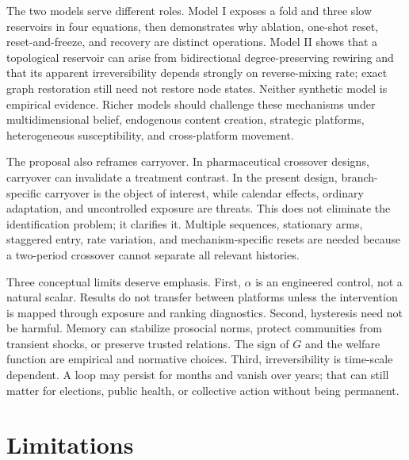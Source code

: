 \documentclass[10pt,a4paper]{article}
\begin{document}
The two models serve different roles. Model I exposes a fold and three slow reservoirs in four equations, then demonstrates why ablation, one-shot reset, reset-and-freeze, and recovery are distinct operations. Model II shows that a topological reservoir can arise from bidirectional degree-preserving rewiring and that its apparent irreversibility depends strongly on reverse-mixing rate; exact graph restoration still need not restore node states. Neither synthetic model is empirical evidence. Richer models should challenge these mechanisms under multidimensional belief, endogenous content creation, strategic platforms, heterogeneous susceptibility, and cross-platform movement.

The proposal also reframes carryover. In pharmaceutical crossover designs, carryover can invalidate a treatment contrast. In the present design, branch-specific carryover is the object of interest, while calendar effects, ordinary adaptation, and uncontrolled exposure are threats. This does not eliminate the identification problem; it clarifies it. Multiple sequences, stationary arms, staggered entry, rate variation, and mechanism-specific resets are needed because a two-period crossover cannot separate all relevant histories.

Three conceptual limits deserve emphasis. First, $\alpha$ is an engineered control, not a natural scalar. Results do not transfer between platforms unless the intervention is mapped through exposure and ranking diagnostics. Second, hysteresis need not be harmful. Memory can stabilize prosocial norms, protect communities from transient shocks, or preserve trusted relations. The sign of $G$ and the welfare function are empirical and normative choices. Third, irreversibility is time-scale dependent. A loop may persist for months and vanish over years; that can still matter for elections, public health, or collective action without being permanent.

\section{Limitations}
\end{document}
